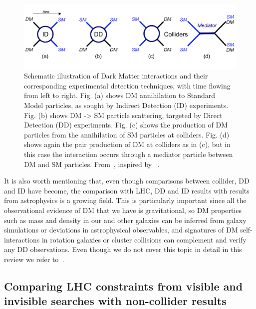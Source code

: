\begin{figure}[!htpb]
\includegraphics[width=\textwidth]{figures/EFTSimplifiedModels}
\caption{Schematic illustration of Dark Matter interactions and their corresponding experimental detection techniques, with time flowing from left to right. Fig. (a) shows DM annihilation to Standard Model particles, as sought by Indirect Detection (ID) experiments. Fig. (b) shows DM -> SM particle scattering, targeted by Direct Detection (DD) experiments. Fig. (c) shows the production of DM particles from the annihilation of SM particles at colliders. Fig. (d) shows again the pair production of DM at colliders as in (c), but in this case the interaction occurs through a mediator particle between DM and SM particles. From~\cite{monoXfig}, inspired by ~\cite{Bauer:2013ihz}.}
\label{fig:Complementarity}
\end{figure}

It is also worth mentioning that, even though comparisons between collider, DD and ID have become, the comparison with
LHC, DD and ID results with results from astrophysics is a growing field. 
This is particularly important since all the observational evidence of DM that we have is gravitational,
so DM properties such as mass and density in our and other galaxies
can be inferred from galaxy simulations or deviations in astrophysical observables, 
and signatures of DM self-interactions in rotation galaxies or cluster collisions can complement and verify any DD 
observations. Even though we do not cover this topic in detail in this review we refer to~\cite{Buckley:2017ijx}. 

\subsection{Comparing LHC constraints from visible and invisible searches with non-collider results}

